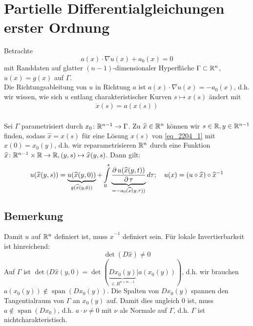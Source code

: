 \section{Partielle Differentialgleichungen erster Ordnung}
\label{sec:para3}

	Betrachte 
	\[ a(x) \cdot \nabla u(x) + a_0(x) = 0 \] mit Randdaten auf glatter $(n-1)$-dimensionaler Hyperfläche $\Gamma \subset \mathbb{R}^n$, $u(x) = g(x)$ auf $\Gamma$. \\
	Die Richtungsableitung von $u$ in Richtung $a$ ist $a(x) \cdot \nabla u(x) = -a_0 (x)$, d.h. wir wissen, wie sich $u$ entlang charakteristischer Kurven $s \mapsto x(s)$ ändert mit
	\begin{equation}
	\begin{aligned}
		\dot{x}(s) = a(x(s)) \label{eq_2204_1}
	\end{aligned}
	\end{equation} \\
	Sei $\Gamma$ parametrisiert durch $x_0 \colon \mathbb{R}^{n-1} \rightarrow \Gamma$. Zu $\widehat{x} \in \mathbb{R}^n$ können wir $s \in \mathbb{R}, y \in \mathbb{R}^{n-1}$ finden, sodass $\widehat{x} = x(s)$ für eine Lösung $x(s)$ von \eqref{eq_2204_1} mit $x(0) = x_0(y)$, d.h. wir reparametrisieren $\mathbb{R}^n$ durch eine Funktion $\widehat{x}\colon \mathbb{R}^{n-1} \times \mathbb{R} \rightarrow \mathbb{R}, (y,s) \mapsto \widehat{x}(y,s)$. Dann gilt:
	\[ u(\widehat{x}(y,s)) = \underbrace{u(\widehat{x}(y,0))}_{g(\widehat{x}(y,0))} + \int\limits_{0}^{s} \underbrace{\frac{\operatorname{\partial} u(\widehat{x}(y,t))}{\operatorname{\partial} \tau}}_{=-a_0(\widehat{x}(y,\tau))} d\tau; \quad u(x) = (u \circ \widehat{x}) \circ \widehat{x}^{-1} \]
	
\subsection{Bemerkung}
\label{bem_2}
	Damit $u$ auf $\mathbb{R}^n$ definiert ist, muss $\widehat{x}^{-1}$ definiert sein.\marginnote{[2]} Für lokale Invertierbarkeit ist hinreichend:
	\[ \det(D \widehat{x}) \neq 0 \]
	Auf $\Gamma$ ist $\det(D \widehat{x}(y,0) = \det( \underbrace{D x_0(y)}_{\in R^{n\times m -1}}\vert a(x_0(y)))$, d.h. wir brauchen $a(x_0(y)) \notin \operatorname{span}(Dx_0(y))$. Die Spalten von $Dx_0(y)$ spannen den Tangentialraum von $\Gamma$ an $x_0(y)$ auf. Damit dies ungleich 0 ist, muss $a \notin \operatorname{span}(Dx_0)$, d.h. $a \cdot \nu \neq 0$ mit $\nu$ als Normale auf $\Gamma$, d.h. $\Gamma$ ist nichtcharakteristisch.
	
